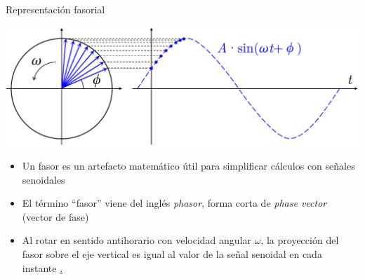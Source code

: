 \documentclass[aspectratio=169, usenames,svgnames,dvipsnames]{beamer}
\begin{document}
\begin{frame}{Representación fasorial}

    \begin{center}
        \includegraphics[height=0.45\textheight]{../figs/Fasor_rotante.pdf}
    \end{center}

    \vspace{-2mm}
    \begin{itemize}
        \item Un \alert{fasor} es un artefacto matemático \alert{útil para simplificar cálculos} con señales senoidales

        \vspace{2mm}
        \item El término ``fasor'' viene del inglés \textit{phasor}, forma corta de \textit{phase vector} (vector de fase)

        \vspace{2mm}
        \item Al \alert{rotar en sentido antihorario} con velocidad angular $\omega$, la proyección del fasor sobre el eje vertical es igual al valor de la señal senoidal en cada instante \hyperlink{diapo:gif_fasores}{.}
    \end{itemize}   

\end{frame}

\end{document}
